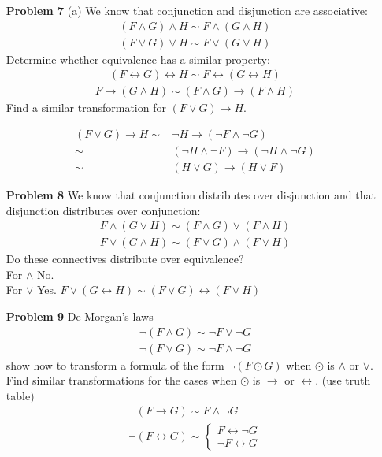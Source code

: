 \documentclass[12pt]{article}
\begin{document}
\begin{enumerate}
\item[\textbf{Problem 7}] (a) We know that conjunction and disjunction are associative: 
\begin{gather*}
(F \wedge G) \wedge H \sim F \wedge (G \wedge H) \\
(F \vee G) \vee H \sim F \vee (G \vee H)
\end{gather*}
Determine whether equivalence has a similar property: 
\begin{gather*}
 (F \leftrightarrow G) \leftrightarrow H \sim F \leftrightarrow (G \leftrightarrow H)
\end{gather*}
    \begin{gather*}
 F \rightarrow (G \wedge H) \sim (F \wedge G) \rightarrow (F \wedge H)
\end{gather*}
Find a similar transformation for $(F \vee G) \rightarrow H$. 

\begin{eqnarray*} 
(F \vee G) \rightarrow H 
                         \sim & \neg H \rightarrow (\neg F \wedge \neg G) \\
                         \sim & (\neg H \wedge \neg F) \rightarrow (\neg H \wedge \neg G) \\  
                         \sim & (H \vee G) \rightarrow (H \vee F)
\end{eqnarray*}


\item[\textbf{Problem 8}] We know that conjunction distributes over disjunction and that disjunction distributes over conjunction: 
\begin{gather*}
 F \wedge (G \vee H) \sim (F \wedge G) \vee (F \wedge H) \\
 F \vee (G \wedge H) \sim (F \vee G) \wedge (F \vee H)
\end{gather*}
Do these connectives distribute over equivalence? \\

For $\wedge$ No. \\
For $\vee$ Yes. $ F \vee (G \leftrightarrow H) \sim (F \vee G) \leftrightarrow (F \vee H)$ 

\item[\textbf{Problem 9}] De Morgan's laws
\begin{gather*}
 \neg ( F \wedge G) \sim \neg F \vee \neg G \\
 \neg ( F \vee G) \sim \neg F \wedge \neg G
\end{gather*}
show how to transform a formula of the form $\neg (F \odot G)$ when $\odot$ is $\wedge$ or $\vee$. Find similar transformations for the cases when $\odot$ is $\rightarrow$ or $\leftrightarrow$. (use truth table)
 \begin{gather*}
     \neg (F \rightarrow G) \sim F \wedge \neg G   \\
     \neg (F \leftrightarrow G) \sim \left\{
        \begin{array}{c}      
        F \leftrightarrow \neg G\\
        \neg F \leftrightarrow G
        \end{array}\right.
 \end{gather*}


\end{enumerate}
\end{document}
